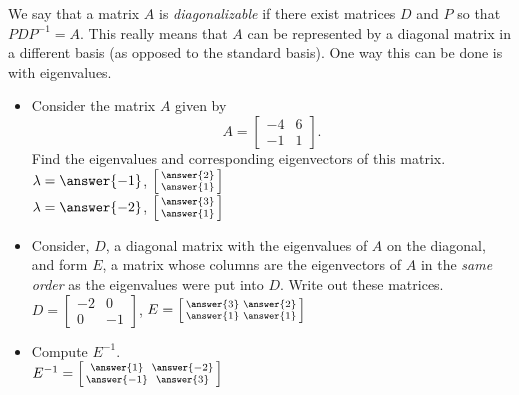 \documentclass{ximera}
\begin{document}
\begin{exercise} \label{ex:diagonalization}
    We say that a matrix $A$ is \emph{diagonalizable} if there exist matrices $D$ and $P$ so that $PDP^{-1} = A$. This really means that $A$ can be represented by a diagonal matrix in a different basis (as opposed to the standard basis). One way this can be done is with eigenvalues.
    \begin{itemize}
        \item Consider the matrix $A$ given by 
            \[ 
            A = 
            \begin{bmatrix} 
            -4 & 6 \\ 
            -1 & 1 
            \end{bmatrix}. 
            \]
            Find the eigenvalues and corresponding eigenvectors of this matrix.\\
            $\lambda = \answer{-1}$, $\left[\begin{smallmatrix} \answer{2} \\ \answer{1} \end{smallmatrix}\right]$\\
            $\lambda = \answer{-2}$, $\left[\begin{smallmatrix} \answer{3} \\ \answer{1} \end{smallmatrix}\right]$
        
        \item Consider, $D$, a diagonal matrix with the eigenvalues of $A$ on the diagonal, and form $E$, a matrix whose columns are the eigenvectors of $A$ in the \emph{same order} as the eigenvalues were put into $D$. Write out these matrices.\\
            $D = \left[\begin{smallmatrix} -2 & 0 \\ 0 & -1 \end{smallmatrix}\right]$, $E = \left[\begin{smallmatrix} \answer{3} & \answer{2} \\ \answer{1} & \answer{1} \end{smallmatrix}\right]$
        
        \item Compute $E^{-1}$. \\
            $E^{-1} = \left[\begin{smallmatrix} \answer{1} & \answer{-2} \\ \answer{-1} & \answer{3} \end{smallmatrix}\right]$
        

\end{itemize}
\end{exercise}
\end{document}
